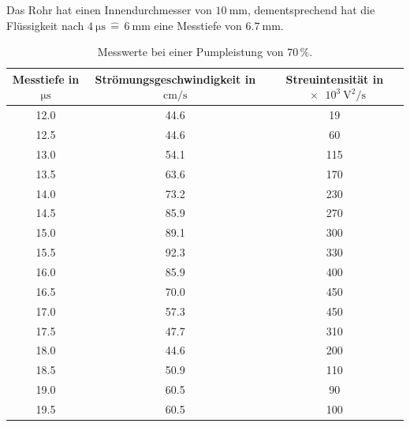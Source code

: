 Das Rohr hat einen Innendurchmesser von $\SI{10}{\milli\meter}$, dementsprechend hat die Flüssigkeit nach $\SI{4}{\micro\second}\,\widehat{=}\,\SI{6}{\milli\meter}$
eine Messtiefe von $\SI{6.7}{\milli\meter}$. 

%    

\begin{table}
    \centering
    \caption{Messwerte bei einer Pumpleistung von $70\,\%$.}
    \label{tab:70percent}
    \begin{tabular}{c c c}
        \toprule
        Messtiefe in $\si{\micro\second}$ & Strömungsgeschwindigkeit in $\si{\centi\meter\per\second}$ & Streuintensität in $\SI{e3}{\volt\squared\per\second}$ \\
        \midrule
        12.0 & 44.6 &  19 \\
        12.5 & 44.6 &  60 \\
        13.0 & 54.1 & 115 \\
        13.5 & 63.6 & 170 \\
        14.0 & 73.2 & 230 \\
        14.5 & 85.9 & 270 \\
        15.0 & 89.1 & 300 \\
        15.5 & 92.3 & 330 \\
        16.0 & 85.9 & 400 \\
        16.5 & 70.0 & 450 \\
        17.0 & 57.3 & 450 \\
        17.5 & 47.7 & 310 \\
        18.0 & 44.6 & 200 \\
        18.5 & 50.9 & 110 \\
        19.0 & 60.5 &  90 \\
        19.5 & 60.5 & 100 \\
        \bottomrule
    \end{tabular}
\end{table}

